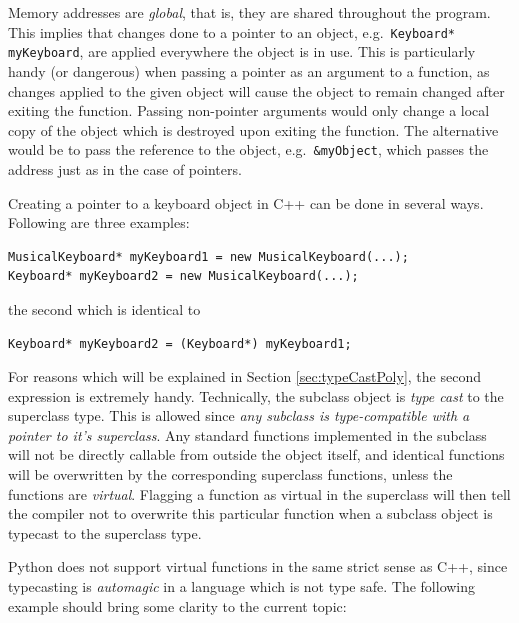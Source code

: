 Memory addresses are \textit{global}, that is, they are shared throughout the program. This implies that changes done to a pointer to an object, e.g.~\verb+Keyboard* myKeyboard+, are applied everywhere the object is in use. This is particularly handy (or dangerous) when passing a pointer as an argument to a function, as changes applied to the given object will cause the object to remain changed after exiting the function. Passing non-pointer arguments would only change a local copy of the object which is destroyed upon exiting the function. The alternative would be to pass the reference to the object, e.g.~\verb+&myObject+, which passes the address just as in the case of pointers. 

Creating a pointer to a keyboard object in C++ can be done in several ways. Following are three examples: 
\begin{lstlisting}
MusicalKeyboard* myKeyboard1 = new MusicalKeyboard(...);
Keyboard* myKeyboard2 = new MusicalKeyboard(...);
\end{lstlisting}

the second which is identical to 

\begin{lstlisting}
Keyboard* myKeyboard2 = (Keyboard*) myKeyboard1;
\end{lstlisting}

For reasons which will be explained in Section \ref{sec:typeCastPoly}, the second expression is extremely handy. Technically, the subclass object is \textit{type cast} to the superclass type. This is allowed since \textit{any subclass is type-compatible with a pointer to it's superclass}. Any standard functions implemented in the subclass will not be directly callable from outside the object itself, and identical functions will be overwritten by the corresponding superclass functions, unless the functions are \textit{virtual}. Flagging a function as virtual in the superclass will then tell the compiler not to overwrite this particular function when a subclass object is typecast to the superclass type.

Python does not support virtual functions in the same strict sense as C++, since typecasting is \textit{automagic} in a language which is not type safe. The following example should bring some clarity to the current topic:

\vspace{0.5 cm}

\clearpage


